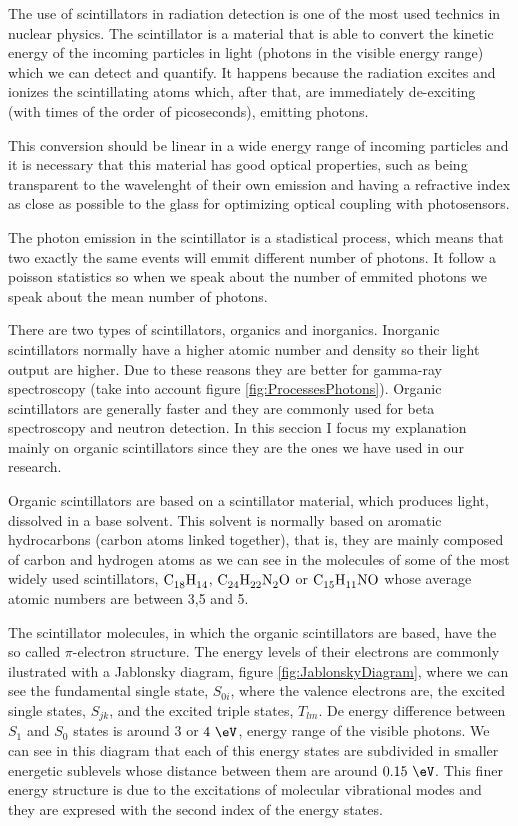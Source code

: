 The use of scintillators in radiation detection is one of the most used technics in nuclear physics. The scintillator is a material that is able to convert the kinetic energy of the incoming particles in light (photons in the visible energy range) which we can detect and quantify. It happens because the radiation excites and ionizes the scintillating atoms which, after that, are immediately de-exciting (with times of the order of picoseconds), emitting photons.

This conversion should be linear in a wide energy range of incoming particles and it is necessary that this material has good optical properties, such as being transparent to the wavelenght of their own emission and having a refractive index as close as possible to the glass for optimizing optical coupling with photosensors.

The photon emission in the scintillator is a stadistical process, which means that two exactly the same events will emmit different number of photons. It follow a poisson statistics so when we speak about the number of emmited photons we speak about the mean number of photons.

There are two types of scintillators, organics and inorganics. Inorganic scintillators normally have a higher atomic number and density so their light output are higher. Due to these reasons they are better for gamma-ray spectroscopy (take into account figure \ref{fig:ProcessesPhotons}). Organic scintillators are generally faster and they are commonly used for beta spectroscopy and neutron detection. In this seccion I focus my explanation mainly on organic scintillators since they are the ones we have used in our research. 

Organic scintillators are based on a scintillator material, which produces light, dissolved in a base solvent. This solvent is normally based on aromatic hydrocarbons (carbon atoms linked together), that is, they are mainly composed of carbon and hydrogen atoms as we can see in the molecules of some of the most widely used scintillators, $\ce{C_{18}H_{14}}$, $\ce{C_{24}H_{22}N_{2}O}$ or $\ce{C_{15}H_{11}NO}$ whose average atomic numbers are between 3,5 and 5.

The scintillator molecules, in which the organic scintillators are based, have the so called $\pi$-electron structure. The energy levels of their electrons are commonly ilustrated with a Jablonsky diagram, figure \ref{fig:JablonskyDiagram}, where we can see the fundamental single state, $S_{0i}$, where the valence electrons are, the excited single states, $S_{jk}$, and the excited triple states, $T_{lm}$. De energy difference between $S_1$ and $S_0$ states is around $3$ or $4~\eV$, energy range of the visible photons. We can see in this diagram that each of this energy states are subdivided in smaller energetic sublevels whose distance between them are around $0.15~\eV$. This finer energy structure is due to the excitations of molecular vibrational modes and they are expresed with the second index of the energy states.

